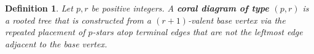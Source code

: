 \documentclass[documentfleqn,12pt]{amsart}
\newtheorem{definition}[theorem]{Definition}
\begin{document}



\begin{definition}
\label{def: coral diagram}
Let $p,r$ be positive integers.  A \textbf{coral diagram of type $(p,r)$} is a rooted tree that is constructed from a $(r+1)$-valent base vertex via the repeated placement of $p$-stars atop terminal edges that are not the leftmost edge adjacent to the base vertex.
\end{definition}
\end{document}

